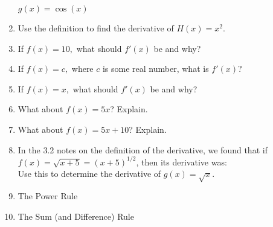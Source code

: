 \documentclass[11pt,fleqn]{article}
\begin{document}
\begin{enumerate}
{\Large{$g(x)=\cos(x)$}}\\

\item Use the definition to find the derivative of $H(x)=x^2.$\\
\vspace{2in}
\item If $f(x)=10,$ what should $f'(x)$ be and why? 
\vfill

\item If $f(x)=c,$ where $c$ is some real number, what is $f'(x)$? 
\vfill
\newpage
\item If $f(x)=x,$ what should $f'(x)$ be and why? 

\vfill
\item What about $f(x)=5x$? Explain.
\vfill
\item What about $f(x)=5x+10$? Explain.
\vfill

\item In the 3.2 notes on the definition of the derivative, we found that if $f(x) =\sqrt{x+5}=(x+5)^{1/2}$, then its derivative was: \\

Use this to determine the derivative of $g(x)=\sqrt{x}.$
\vfill
\item The Power Rule\\
\vfill
\item The Sum (and Difference) Rule\\
\vfill


\end{enumerate}
\end{document}
